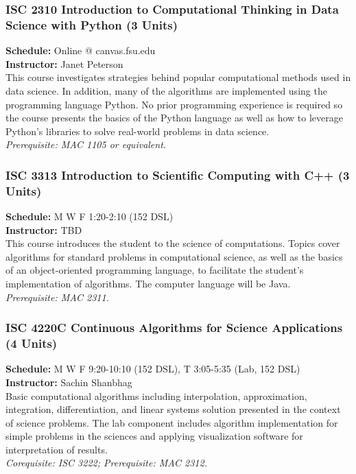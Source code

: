 \documentclass[12pt,a4paper]{article}
\begin{document}
\subsubsection*{ISC 2310 Introduction to Computational Thinking in Data Science with Python (3 Units)}
\textbf{Schedule:} Online @ canvas.fsu.edu \\
\textbf{Instructor:} Janet Peterson \\
This course investigates strategies behind popular computational methods used in data science. In addition, many of the algorithms are implemented using the programming language Python. No prior programming experience is required so the course presents the basics of the Python language as well as how to leverage Python’s libraries to solve real-world problems in data science. \\
\textit{Prerequisite: MAC 1105 or equivalent.}

\subsubsection*{ISC 3313 Introduction to Scientific Computing with C++ (3 Units)}
\textbf{Schedule:} M W F 1:20-2:10 (152 DSL) \\
\textbf{Instructor:} TBD \\
This course introduces the student to the science of computations. Topics cover algorithms for standard problems in computational science, as well as the basics of an object-oriented programming language, to facilitate the student’s implementation of algorithms. The computer language will be Java. \\
\textit{Prerequisite: MAC 2311.}

\subsubsection*{ISC 4220C Continuous Algorithms for Science Applications (4 Units)}
\textbf{Schedule:} M W F 9:20-10:10 (152 DSL), T 3:05-5:35 (Lab, 152 DSL) \\
\textbf{Instructor:} Sachin Shanbhag \\
Basic computational algorithms including interpolation, approximation, integration, differentiation, and linear systems solution presented in the context of science problems. The lab component includes algorithm implementation for simple problems in the sciences and applying visualization software for interpretation of results. \\
\textit{Corequisite: ISC 3222; Prerequisite: MAC 2312.}
\end{document}
